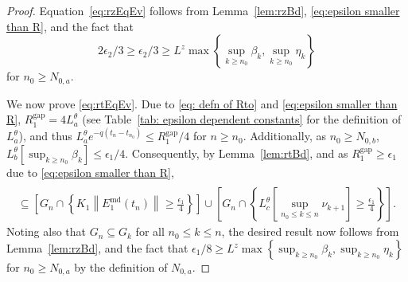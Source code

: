 \documentclass[usenames,dvipsnames,final,12pt]{colt2018} %
\newcommand{\et}{\epsilon_1}
\newcommand{\etg}{R_1^{\textrm{gap}}}
\newcommand{\rt}{\rho}
\newcommand{\Et}{E_1}
\newcommand{\Kt}{K_1}
\newcommand{\EtM}{\Et^{\md}}
\newcommand{\Lt}[1]{L^{\theta}_{#1}}
\newcommand{\ez}{\epsilon_2}
\newcommand{\ezg}{R_2^{\textrm{gap}}}
\newcommand{\rz}{\nu}
\newcommand{\Lz}{L^z}
\newcommand{\N}[1]{N_{0,#1}}
\newcommand{\lm}{q}
\newcommand{\md}{\text{md}}
\newcommand{\tI}[1]{t_{#1}}
\newcommand{\norm}[1]{\left\lVert#1\right\rVert}
\newcommand{\gal}[1]{#1}
\begin{document}
%
\begin{proof}
Equation~\eqref{eq:rzEqEv} follows from Lemma~\ref{lem:rzBd}, \eqref{eq:epsilon smaller than R},
{ and the fact that $$2\ez/3 \geq \ez/3 \geq \Lz \max \left\{\sup_{k \geq n_0} \beta_k, \sup_{k \geq n_0} \eta_k \right\}$$ for $n_0 \geq \N{a}$.}

We now prove \eqref{eq:rtEqEv}.
{
Due to \eqref{eq: defn of Rto} and \eqref{eq:epsilon smaller than R}, $\etg = 4 \Lt{a}$ (see Table~\ref{tab: epsilon dependent constants} for the definition of $\Lt{a}$), and thus $\Lt{a} e^{-\lm (\tI{n} - \tI{n_0})} \leq \etg/4$ for $n \geq n_0$.
Additionally, as $n_0 \geq \N{b}$, $\Lt{b} \left[\sup_{k \geq n_0} \beta_k \right] \leq \et/4$. %
Consequently, by Lemma~\ref{lem:rtBd}, and as $\etg \geq \et$ due to \eqref{eq:epsilon smaller than R},
}
%
\begin{multline*}
[ G_n \cap \{\rt_{n + 1} \geq \etg\}] \\
\subseteq \left[ G_n \cap \left\{ \Kt \norm{\EtM(\tI{n})} \geq \frac{{\et}}{4}\right\}\right] \cup \left[ G_n \cap \left\{ \Lt{c} \left[ \sup_{n_0 \leq k \leq n} \rz_{k + 1}\right]  \geq \frac{{\et}}{4}\right\}\right].
\end{multline*}
%
{Noting also that %
$G_n \subseteq G_k$ for all $n_0 \leq k \leq n$, the desired result now follows from Lemma~\ref{lem:rzBd},
and the fact that $\et/8 \geq \Lz \max \left\{\sup_{k \geq n_0} \beta_k, \sup_{k \geq n_0} \eta_k \right\}$ for $n_0 \geq \N{a}$ by the definition of $\N{a}$.}
\end{proof}
\end{document}
